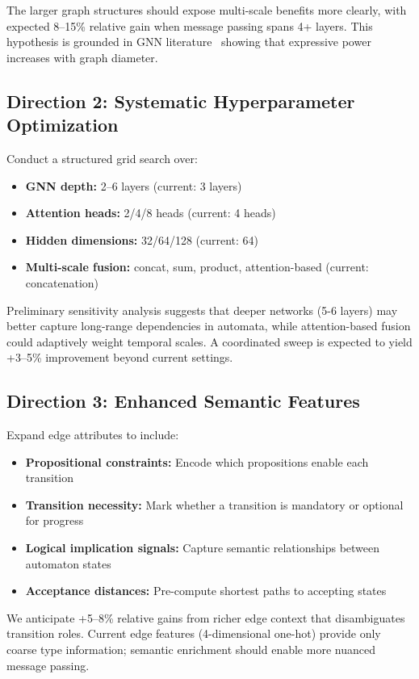 \documentclass{article}
\begin{document}
The larger graph structures should expose multi-scale benefits more clearly, with expected 8--15\% relative gain when message passing spans 4+ layers. This hypothesis is grounded in GNN literature~\citep{Kipf2017} showing that expressive power increases with graph diameter.

\subsection{Direction 2: Systematic Hyperparameter Optimization}

Conduct a structured grid search over:
\begin{itemize}
\item \textbf{GNN depth:} 2--6 layers (current: 3 layers)
\item \textbf{Attention heads:} 2/4/8 heads (current: 4 heads)
\item \textbf{Hidden dimensions:} 32/64/128 (current: 64)
\item \textbf{Multi-scale fusion:} concat, sum, product, attention-based (current: concatenation)
\end{itemize}

Preliminary sensitivity analysis suggests that deeper networks (5-6 layers) may better capture long-range dependencies in automata, while attention-based fusion could adaptively weight temporal scales. A coordinated sweep is expected to yield +3--5\% improvement beyond current settings.

\subsection{Direction 3: Enhanced Semantic Features}

Expand edge attributes to include:
\begin{itemize}
\item \textbf{Propositional constraints:} Encode which propositions enable each transition
\item \textbf{Transition necessity:} Mark whether a transition is mandatory or optional for progress
\item \textbf{Logical implication signals:} Capture semantic relationships between automaton states
\item \textbf{Acceptance distances:} Pre-compute shortest paths to accepting states
\end{itemize}

We anticipate +5--8\% relative gains from richer edge context that disambiguates transition roles. Current edge features (4-dimensional one-hot) provide only coarse type information; semantic enrichment should enable more nuanced message passing.
\end{document}
